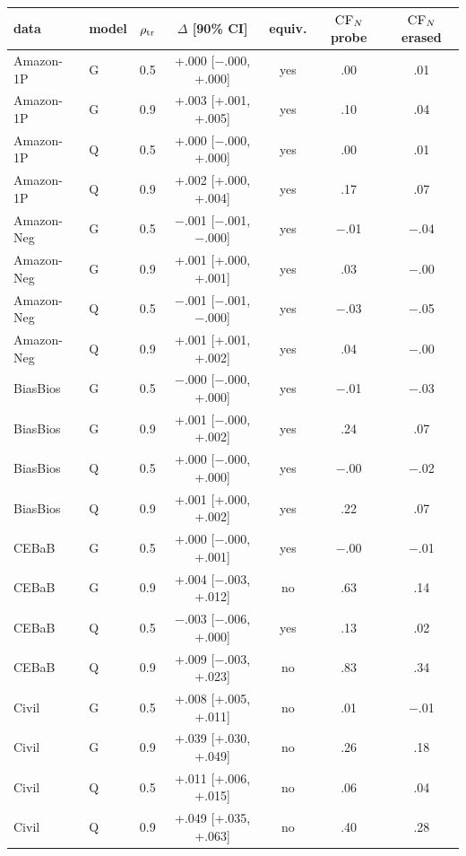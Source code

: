\begin{tabular}{@{}lllcccc@{}}
\toprule
data & model & $\rho_{\text{tr}}$ & $\Delta$\dec{} [90\% CI] & equiv. & $\textsc{CF}_{N}$ probe & $\textsc{CF}_{N}$ erased \\
\midrule
Amazon-1P & G & 0.5 & +.000 [$-$.000, +.000] & yes & .00 & .01 \\
Amazon-1P & G & 0.9 & +.003 [+.001, +.005] & yes & .10 & .04 \\
Amazon-1P & Q & 0.5 & +.000 [$-$.000, +.000] & yes & .00 & .01 \\
Amazon-1P & Q & 0.9 & +.002 [+.000, +.004] & yes & .17 & .07 \\
Amazon-Neg & G & 0.5 & $-$.001 [$-$.001, $-$.000] & yes & $-$.01 & $-$.04 \\
Amazon-Neg & G & 0.9 & +.001 [+.000, +.001] & yes & .03 & $-$.00 \\
Amazon-Neg & Q & 0.5 & $-$.001 [$-$.001, $-$.000] & yes & $-$.03 & $-$.05 \\
Amazon-Neg & Q & 0.9 & +.001 [+.001, +.002] & yes & .04 & $-$.00 \\
BiasBios & G & 0.5 & $-$.000 [$-$.000, +.000] & yes & $-$.01 & $-$.03 \\
BiasBios & G & 0.9 & +.001 [$-$.000, +.002] & yes & .24 & .07 \\
BiasBios & Q & 0.5 & +.000 [$-$.000, +.000] & yes & $-$.00 & $-$.02 \\
BiasBios & Q & 0.9 & +.001 [+.000, +.002] & yes & .22 & .07 \\
CEBaB & G & 0.5 & +.000 [$-$.000, +.001] & yes & $-$.00 & $-$.01 \\
CEBaB & G & 0.9 & +.004 [$-$.003, +.012] & no & .63 & .14 \\
CEBaB & Q & 0.5 & $-$.003 [$-$.006, +.000] & yes & .13 & .02 \\
CEBaB & Q & 0.9 & +.009 [$-$.003, +.023] & no & .83 & .34 \\
Civil & G & 0.5 & +.008 [+.005, +.011] & no & .01 & $-$.01 \\
Civil & G & 0.9 & +.039 [+.030, +.049] & no & .26 & .18 \\
Civil & Q & 0.5 & +.011 [+.006, +.015] & no & .06 & .04 \\
Civil & Q & 0.9 & +.049 [+.035, +.063] & no & .40 & .28 \\
\bottomrule
\end{tabular}
